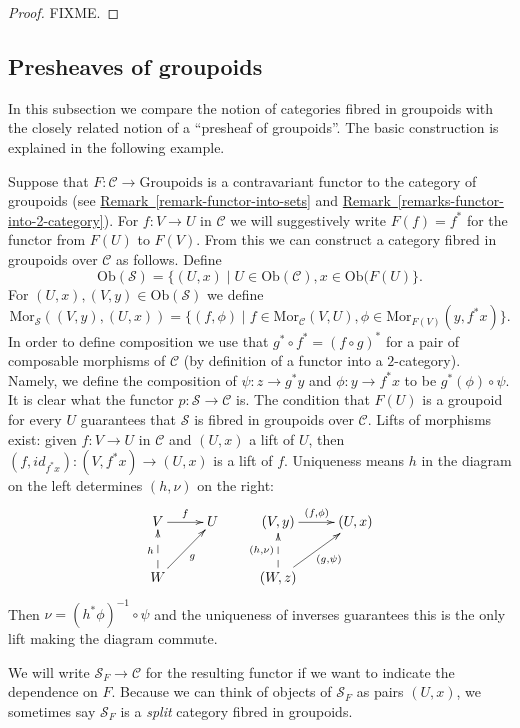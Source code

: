 \begin{proof}
FIXME.
\end{proof}

\subsection{Presheaves of groupoids}
\label{subsection-presheaves-groupoids}

\noindent
In this subsection we compare the notion of categories fibred in groupoids
with the closely related notion of a ``presheaf of groupoids''. The basic
construction is explained in the following example.

\begin{example}
\label{example-functor-groupoids}
Suppose that $F : \mathcal{C} \to \text{Groupoids}$ is a contravariant functor
to the category of groupoids (see 
\hyperref[remark-functor-into-sets]{Remark~\ref*{remark-functor-into-sets}} and
\hyperref[remarks-functor-into-2-category]%
{Remark~\ref{remarks-functor-into-2-category}}). 
For $f : V \to U$ in $\mathcal{C}$ we will
suggestively write $F(f) = f^\ast$ for the functor from $F(U)$ to $F(V)$. 
From this we can construct a category fibred in groupoids over $\mathcal{C}$ 
as follows. Define 
$$
\text{Ob}(\mathcal{S}) =
\{(U,x) \mid U\in \text{Ob}(\mathcal{C}), x\in \text{Ob}(F(U)\}.
$$ 
For $(U,x), (V,y) \in \text{Ob}(\mathcal{S})$ we define
$$
\text{Mor}_\mathcal{S}((V,y),(U,x)) = 
\{ (f, \phi) \mid f\in \text{Mor}_\mathcal{C}(V,U), 
\phi \in \text{Mor}_{F(V)}(y, f^\ast x)\}.
$$
In order to define composition we use that $g^\ast \circ f^\ast = 
(f \circ g)^\ast$ for a pair of composable morphisms of $\mathcal{C}$
(by definition of a functor into a $2$-category).
Namely, we define the composition of $\psi : z \to g^\ast y$ and 
$ \phi : y \to f^\ast x$ to be $ g^\ast(\phi) \circ \psi$. It is clear
what the functor $p : \mathcal{S} \to \mathcal{C}$ is. The condition
that $F(U)$ is a groupoid for every $U$ guarantees that $\mathcal{S}$ is
fibred in groupoids over $\mathcal{C}$. Lifts of morphisms exist: given 
$f: V \to U$ in $\mathcal{C}$ and $(U,x)$ a lift of $U$, then 
$(f, id_{f^\ast x}): (V, {f^\ast x}) \to (U,x)$ is a lift of $f$. 
Uniqueness means $h$ in the diagram on the left determines $(h,\nu)$ on 
the right:
$$
\xymatrix{
V \ar[r]^f & U & (V,y) \ar[r]^{(f, \phi)} & (U,x) \\
W \ar@{-->}[u]^h \ar[ru]_g & &
(W,z) \ar@{-->}[u]^{(h,\nu)} \ar[ru]_{(g, \psi)} & \\
}
$$
Then $\nu = (h^\ast \phi)^{-1} \circ \psi $ and the uniqueness of inverses
guarantees this is the only lift making the diagram commute.

\noindent
We will write $\mathcal{S}_F \to \mathcal{C}$ for the resulting functor
if we want to indicate the dependence on $F$. Because we can think of 
objects of $\mathcal{S}_F$ as pairs $(U,x)$, we sometimes say $\mathcal{S}_F$ 
is a {\it split} category fibred in groupoids.
\end{example}

